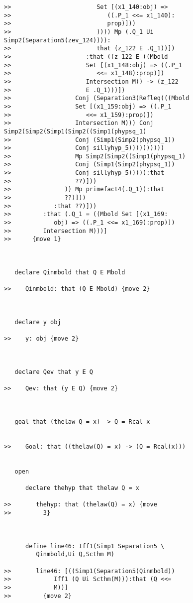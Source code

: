 \documentclass[12pt]{article}
\begin{document}
\begin{verbatim}
>>                        Set [(x1_140:obj) =>
>>                           ((.P_1 <<= x1_140):
>>                           prop)]))
>>                        )))) Mp (.Q_1 Ui Simp2(Separation5(zev_124)))):
>>                        that (z_122 E .Q_1))])
>>                     :that ((z_122 E ((Mbold
>>                     Set [(x1_148:obj) => ((.P_1
>>                        <<= x1_148):prop)])
>>                     Intersection M)) -> (z_122
>>                     E .Q_1)))])
>>                  Conj (Separation3(Refleq(((Mbold
>>                  Set [(x1_159:obj) => ((.P_1
>>                     <<= x1_159):prop)])
>>                  Intersection M))) Conj Simp2(Simp2(Simp1(Simp2((Simp1(phypsq_1)
>>                  Conj (Simp1(Simp2(phypsq_1))
>>                  Conj sillyhyp_5))))))))))
>>                  Mp Simp2(Simp2((Simp1(phypsq_1)
>>                  Conj (Simp1(Simp2(phypsq_1))
>>                  Conj sillyhyp_5))))):that
>>                  ??)]))
>>               )) Mp primefact4(.Q_1)):that
>>               ??)]))
>>            :that ??)]))
>>         :that (.Q_1 = ((Mbold Set [(x1_169:
>>            obj) => ((.P_1 <<= x1_169):prop)])
>>         Intersection M)))]
>>      {move 1}



   declare Qinmbold that Q E Mbold

>>    Qinmbold: that (Q E Mbold) {move 2}



   declare y obj

>>    y: obj {move 2}



   declare Qev that y E Q

>>    Qev: that (y E Q) {move 2}



   goal that (thelaw Q = x) -> Q = Rcal x


>>    Goal: that ((thelaw(Q) = x) -> (Q = Rcal(x)))


   open

      declare thehyp that thelaw Q = x

>>       thehyp: that (thelaw(Q) = x) {move
>>         3}



      define line46: Iff1(Simp1 Separation5 \
         Qinmbold,Ui Q,Scthm M)

>>       line46: [((Simp1(Separation5(Qinmbold))
>>            Iff1 (Q Ui Scthm(M))):that (Q <<=
>>            M))]
>>         {move 2}




\end{verbatim}
\end{document}

